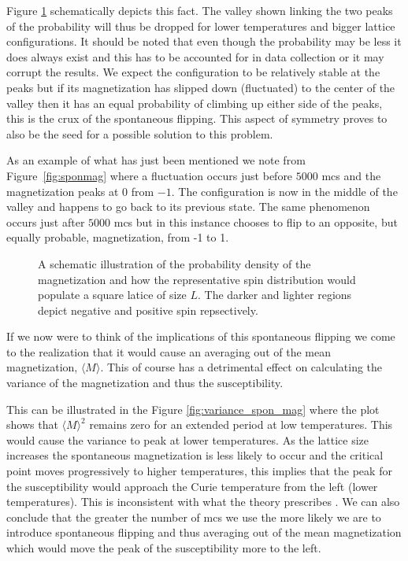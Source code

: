 \documentclass[a4paper]{article}
\begin{document}
Figure \ref{fig:sponmag2} schematically depicts this fact. The valley
shown linking the two peaks of the probability will thus be dropped
for lower temperatures and bigger lattice configurations. It should be
noted that even though the probability may be less it does always
exist and this has to be accounted for in data collection or
it may corrupt the results. We expect
the configuration to be relatively stable at the peaks but if
its magnetization has slipped down (fluctuated) to the center of the valley 
then it has an equal probability of climbing up either side of the
peaks, this is the crux of the spontaneous flipping. This aspect of
symmetry proves to also be the seed for a possible solution to this
problem. 

As an example of what has just been mentioned we note from 
Figure~\ref{fig:sponmag} where a fluctuation occurs just before $5000$
mcs and the magnetization peaks at $0$ from $-1$. The configuration is 
now in the middle of the valley and happens to go back to its previous 
state. The same phenomenon occurs just after $5000$ mcs but in this
instance chooses to flip to an opposite, but equally probable,
magnetization, from -1 to 1. 

\begin{figure}[htb]
  \centering
  \caption{A schematic illustration of the probability density of
    the magnetization and how the representative spin distribution would populate a square latice of size $L$. The darker and lighter regions depict negative and positive spin repsectively.}\label{fig:sponmag2}
\end{figure}
If we now were to think of the implications of this spontaneous
flipping we come to the realization that it would cause an
averaging out of the mean magnetization, $\langle M \rangle$. This of
course has a detrimental effect on calculating the variance of the
magnetization and thus the susceptibility. 

This can be illustrated in
the Figure \ref{fig:variance_spon_mag} where the plot shows that
$\langle M \rangle^2$ remains zero for an extended period at low 
temperatures. This would cause the variance to peak at lower
temperatures. As the lattice size increases the spontaneous
magnetization is less likely to occur and the critical point moves
progressively to higher temperatures, this implies that the peak for
the susceptibility would approach the Curie temperature from the left
(lower temperatures). This is inconsistent with what the theory
prescribes \cite{Cardy}. We can also conclude that the greater
the number of  mcs we use the more likely we are to introduce spontaneous
flipping and thus averaging out of the mean magnetization which would
move the peak of the susceptibility more to the left.
\end{document}
